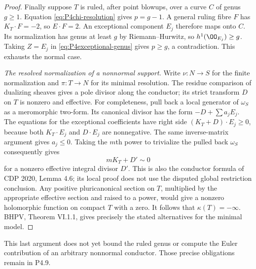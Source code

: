 \begin{proof}
Finally suppose $T$ is ruled, after point blowups, over a curve
$C$ of genus $g\ge1$. Equation \eqref{eq:P4chi-resolution}
gives $p=g-1$. A general ruling fibre $F$ has $K_T\cdot F=-2$,
so $E\cdot F=2$. An exceptional component $E_j$ therefore
maps onto $C$. Its normalization has genus at least $g$ by
Riemann--Hurwitz, so $h^1(\OO_{E_j})\ge g$. Taking $Z=E_j$
in \eqref{eq:P4exceptional-genus} gives $p\ge g$, a contradiction.
This exhausts the normal case.

\emph{The resolved normalization of a nonnormal support.}
Write $\nu:N\to S$ for the finite normalization and $\pi:T\to N$
for its minimal resolution. The residue comparison of dualizing
sheaves gives a pole divisor along the conductor; its strict
transform $D$ on $T$ is nonzero and effective. For completeness,
pull back a local generator of $\omega_S$ as a meromorphic
two-form. Its canonical divisor has the form $-D+\sum a_jE_j$.
The equations for the exceptional coefficients have right side
$(K_T+D)\cdot E_j\ge0$, because both $K_T\cdot E_j$ and
$D\cdot E_j$ are nonnegative. The same inverse-matrix argument
gives $a_j\le0$. Taking the $m$th power to trivialize the pulled
back $\omega_S$ consequently gives
\[
 mK_T+D'\sim0
\]
for a nonzero effective integral divisor $D'$. This is also the
conductor formula of CDP 2020, Lemma 4.6; its local proof does
not use the disputed global restriction conclusion. Any
positive pluricanonical section on $T$, multiplied by the
appropriate effective section and raised to a power, would give
a nonzero holomorphic function on compact $T$ with a zero.
It follows that $\kappa(T)=-\infty$. BHPV, Theorem VI.1.1,
gives precisely the stated alternatives for the minimal model.
\end{proof}

This last argument does not yet bound the ruled genus or compute
the Euler contribution of an arbitrary nonnormal conductor.
Those precise obligations remain in P4.9.

